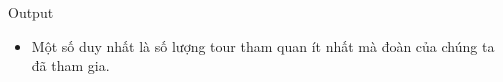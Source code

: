 Output
\begin{itemize}
	\item Một số duy nhất là số lượng tour tham quan ít nhất mà đoàn của chúng ta đã tham gia.
\end{itemize}